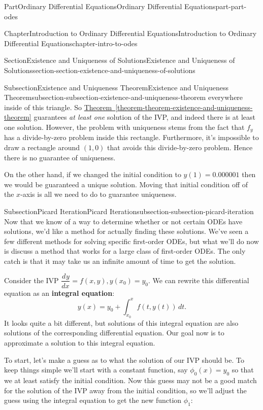 \documentclass[twoside,10pt,]{book}
\newcommand{\xreffont}{\relax}
\newcommand{\terminology}[1]{\textbf{#1}}
\numberwithin{equation}{part}
\newcommand{\dv}[3][]{\dfrac{d^{#1} #2}{d #3^{#1}}}
\begin{document}
\begin{partptx}{Part}{Ordinary Differential Equations}{}{Ordinary Differential Equations}{}{}{part-part-odes}
\begin{chapterptx}{Chapter}{Introduction to Ordinary Differential Equations}{}{Introduction to Ordinary Differential Equations}{}{}{chapter-intro-to-odes}
\begin{sectionptx}{Section}{Existence and Uniqueness of Solutions}{}{Existence and Uniqueness of Solutions}{}{}{section-section-existence-and-uniqueness-of-solutions}
\begin{subsectionptx}{Subsection}{Existence and Uniqueness Theorem}{}{Existence and Uniqueness Theorem}{}{}{subsection-subsection-existence-and-uniqueness-theorem}
everywhere inside of this triangle. So \hyperref[theorem-theorem-existence-and-uniqueness-theorem]{Theorem~{\xreffont\ref{theorem-theorem-existence-and-uniqueness-theorem}}} guarantees \emph{at least one} solution of the IVP, and indeed there is at least one solution. However, the problem with uniqueness stems from the fact that \(f_{y}\) has a divide-by-zero problem inside this rectangle. Furthermore, it's impossible to draw a rectangle around \((1,0)\) that avoids this divide-by-zero problem. Hence there is no guarantee of uniqueness.%
\par
On the other hand, if we changed the initial condition to \(y(1) = 0.000001\) then we would be guaranteed a unique solution. Moving that initial condition off of the \(x\)-axis is all we need to do to guarantee uniqueness.%
\end{subsectionptx}
%
%
\typeout{************************************************}
\typeout{************************************************}
%
\begin{subsectionptx}{Subsection}{Picard Iteration}{}{Picard Iteration}{}{}{subsection-subsection-picard-iteration}
Now that we know of a way to determine whether or not certain ODEs have solutions, we'd like a method for actually finding these solutions. We've seen a few different methods for solving specific first-order ODEs, but what we'll do now is discuss a method that works for a large class of first-order ODEs. The only catch is that it may take us an infinite amount of time to get the solution.%
\par
Consider the IVP \(\dv{y}{x} = f(x,y), y(x_{0}) = y_{0}\). We can rewrite this differential equation as an \terminology{integral equation}:%
\begin{equation*}
y(x) = y_{0} + \int_{x_{0}}^{x}f(t,y(t))\,dt.
\end{equation*}
It looks quite a bit different, but solutions of this integral equation are also solutions of the corresponding differential equation. Our goal now is to approximate a solution to this integral equation.%
\par
To start, let's make a guess as to what the solution of our IVP should be. To keep things simple we'll start with a constant function, say \(\phi_{0}(x) = y_{0}\) so that we at least satisfy the initial condition. Now this guess may not be a good match for the solution of the IVP away from the initial condition, so we'll adjust the guess using the integral equation to get the new function \(\phi_{1}\):%
\begin{equation*}

\end{equation*}
\end{subsectionptx}
\end{sectionptx}
\end{chapterptx}
\end{partptx}
\end{document}
